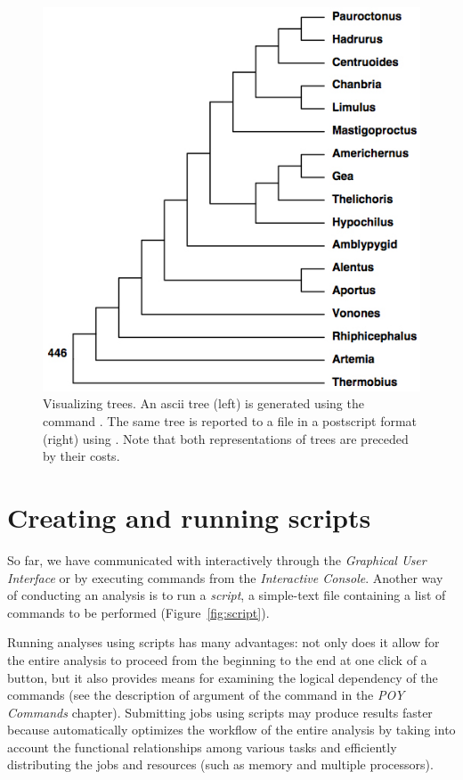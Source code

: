 \begin{figure}
\begin{minipage}[c]{0.5\textwidth}
	   	\includegraphics[width=\textwidth]{figures/pstree.jpg}
   	\end{minipage}
\caption{Visualizing trees. An ascii tree (left) is generated using the command . The same tree is reported to a file in a postscript format (right) using . Note that both representations of trees  are preceded by their costs.}
\label{fig:trees}
\end{figure}

\section{Creating and running \poy scripts}

So far, we have communicated with \poy interactively through the \emph{Graphical User Interface} or by executing commands from the \emph{Interactive Console}. Another way of conducting an analysis is to run a \emph{script}, a simple-text file containing a list of commands to be performed (Figure~\ref{fig:script}). 

Running analyses using scripts has many advantages: not only does it allow for the entire analysis to proceed from the beginning to the end at one click of a button, but it also provides means for examining the logical dependency of the commands (see the description of  argument of the command  in the \emph{POY Commands} chapter). Submitting jobs using scripts may produce results faster because \poy automatically optimizes the workflow of the entire analysis by taking into account the functional relationships among various tasks and efficiently distributing the jobs and resources (such as memory and multiple processors).

